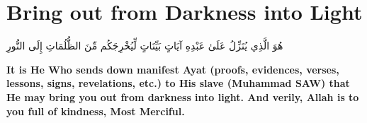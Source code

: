 \chapter{Bring out from Darkness into Light}
\begin{center}
    {\Huge    
        \begin{Arabic}
            هُوَ الَّذِي يُنَزِّلُ عَلَىٰ عَبْدِهِ آيَاتٍ بَيِّنَاتٍ لِّيُخْرِجَكُم مِّنَ الظُّلُمَاتِ إِلَى النُّورِ
        \end{Arabic}
    }
\end{center}
\vspace*{\fill}
\vspace{3cm}
\begin{center}
    \large \textbf{It is He Who sends down manifest Ayat (proofs, evidences, verses, lessons, signs, revelations, etc.) to His slave (Muhammad SAW) that He may bring you out from darkness into light. And verily, Allah is to you full of kindness, Most Merciful.}
\end{center}
